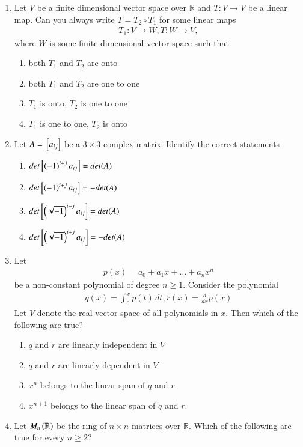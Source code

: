 \begin{enumerate}[label=\thesection.\arabic*.,ref=\thesection.\theenumi]
\begin{enumerate}
\end{enumerate}
\item Let $V$ be a finite dimensional vector space over $\mathbb{R}$ and $T:V\to V$ be a linear map.   Can you always write $T = T_2 \circ T_1$ for some linear maps
\begin{align}
T_1:V\to W, T:W\to V,
\end{align}
where $W$ is some finite dimensional vector space such that\begin{enumerate}
\item both $T_1$ and $T_2$ are onto
\item both $T_1$ and $T_2$ are one to one
\item $T_1$ is onto, $T_2$ is one to one
\item $T_1$ is one to one, $T_2$ is onto
\end{enumerate}
\item Let $A = {}\left[a_{ij}\right]$ be a $3\times 3$ complex matrix.  Identify the correct statements
\begin{enumerate}
\item $det{}\left[\left(-1\right)^{i+j}a_{ij}\right] = det(A)$
\item $det{}\left[\left(-1\right)^{i+j}a_{ij}\right] = -det(A)$
\item $det{}\left[\left(\sqrt{-1}\right)^{i+j}a_{ij}\right] = det(A)$
\item $det{}\left[\left(\sqrt{-1}\right)^{i+j}a_{ij}\right] = -det(A)$
\end{enumerate}
\item Let 
\begin{align}
p(x) = a_0 + a_1x + \dots + a_n x^n 
\end{align}
be a non-constant polynomial of degree $n \ge 1$.  Consider the polynomial
\begin{align}
q(x) = \int_{0}^{x}p(t)\, dt,
r(x) = \frac{d}{dx}p(x)
\end{align}
Let $V$ denote the real vector space of all polynomials in $x$.  Then which of the following are true?
\begin{enumerate}
\item $q$ and $r$ are linearly independent in $V$
\item $q$ and $r$ are linearly dependent in $V$
\item $x^n$ belongs to the linear span of $q$ and $r$
\item $x^{n+1}$ belongs to the linear span of $q$ and $r$.
\end{enumerate}
\item Let $M_n\left(\mathbb{R}\right)$ be the ring of $n \times n$ matrices over $\mathbb{R}$.  Which of the following are true for every $n \ge 2$?

\end{enumerate}
